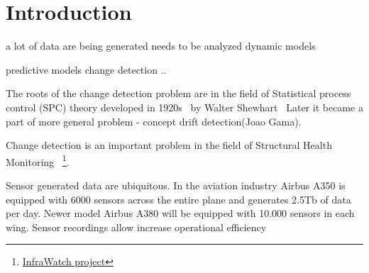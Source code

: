 \chapter{Introduction}

a lot of data are being generated 
needs to be analyzed 
dynamic models 

predictive models
change detection ..

The roots of the change detection problem are in the
field of Statistical process control (SPC) theory
developed in 1920s~\cite{TartakovskySeq} by Walter
Shewhart~\cite{shewhart1931economic}
%
Later it became a part of more general problem -
concept drift detection(Joao Gama).

Change detection is an important problem in the field
of Structural Health Monitoring~\cite{MiaoMultiSensor}
\footnote{\href{http://liacs.leidenuniv.nl/~csinfra/}{InfraWatch project}}.

%

Sensor generated data are ubiquitous.
In the aviation industry Airbus A350 is equipped with 6000 sensors across the
entire plane and generates 2.5Tb of data per day.
Newer model Airbus A380 will be equipped with 10.000 sensors in each wing.  
Sensor recordings allow increase operational efficiency 


